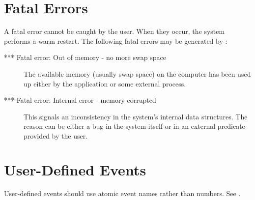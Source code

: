 \section{{\eclipse} Fatal Errors}

A fatal error cannot be caught by the user.
When they occur, the system performs a warm restart.
The following fatal errors may be generated by {\eclipse}:
\begin{description}
\item[*** Fatal error: Out of memory - no more swap space]
The available memory (usually swap space) on the computer has been used up
either by the application or some external process.

\item[*** Fatal error: Internal error - memory corrupted]
This signals an inconsistency in the system's internal data structures.
The reason can be either a bug in the {\eclipse} system itself or in an
external predicate provided by the user.

\end{description}

\section{User-Defined Events}
User-defined events should use atomic event names rather than numbers.
See .


